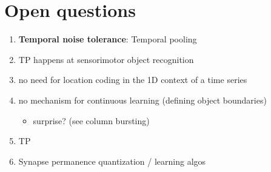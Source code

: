 \documentclass[a4paper,10pt]{article}
\begin{document}
\section{Open questions}
\begin{enumerate}
  \item \textbf{Temporal noise tolerance}: Temporal pooling
  \item TP happens at sensorimotor object recognition
  \item no need for location coding in the 1D context of a time series
  \item no mechanism for continuous learning (defining object boundaries)
      \begin{itemize}
        \item surprise? (see column bursting)
      \end{itemize}
  \item TP
  \item Synapse permanence quantization / learning algos
\end{enumerate}
\end{document}
